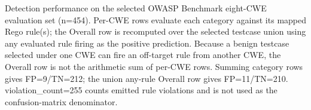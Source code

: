 Detection performance on the selected OWASP Benchmark eight-CWE evaluation set (n=454). Per-CWE rows evaluate each category against its mapped Rego rule(s); the Overall row is recomputed over the selected testcase union using any evaluated rule firing as the positive prediction. Because a benign testcase selected under one CWE can fire an off-target rule from another CWE, the Overall row is not the arithmetic sum of per-CWE rows. Summing category rows gives FP=9/TN=212; the union any-rule Overall row gives FP=11/TN=210. violation_count=255 counts emitted rule violations and is not used as the confusion-matrix denominator.
